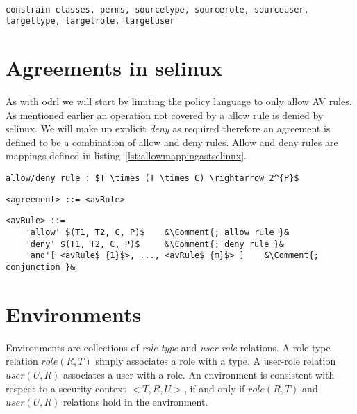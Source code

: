 \lstset{language=selinux}
\begin{lstlisting}[frame=single, caption={Constrain rule},label={lst:constrainselinux}]

constrain classes, perms, sourcetype, sourcerole, sourceuser, targettype, targetrole, targetuser
\end{lstlisting}


\section{Agreements in \ac{selinux}}

As with \ac{odrl} we will start by limiting the policy language to only allow AV rules. As mentioned earlier an operation not covered by a allow rule is denied by \ac{selinux}. We will make up explicit \emph{deny} as required therefore an agreement is defined to be a combination of allow and deny rules. Allow and deny rules are mappings defined in listing~\ref{lst:allowmappingastselinux}.

\lstset{language=AST}
\begin{lstlisting}[frame=single, caption={allow/deny rule as a mapping},label={lst:allowmappingastselinux}]
allow/deny rule : $T \times (T \times C) \rightarrow 2^{P}$
\end{lstlisting}

\lstset{language=AST}
\begin{lstlisting}[frame=single, caption={\ac{selinux} agreement},label={lst:agreementastselinux}]
<agreement> ::= <avRule> 
\end{lstlisting}


\lstset{mathescape, language=AST, escapechar=\&}  
\begin{lstlisting}[frame=single, caption={AV Rule},label={lst:avruleastselinux}]
<avRule> ::=  
	'allow' $(T1, T2, C, P)$	&\Comment{; allow rule }&
	'deny' $(T1, T2, C, P)$	    &\Comment{; deny rule }&
	'and'[ <avRule$_{1}$>, ..., <avRule$_{m}$> ]	&\Comment{; conjunction }&
\end{lstlisting}


\section{Environments}

Environments are collections of \emph{role-type} and \emph{user-role} relations. A role-type relation $role(R, T)$ simply associates a role with a type. A user-role relation $user(U, R)$ associates a user with a role. An environment is consistent with respect to a security context $<T, R, U>$, if and only if $role(R, T)$ and $user(U, R)$ relations hold in the environment. 

